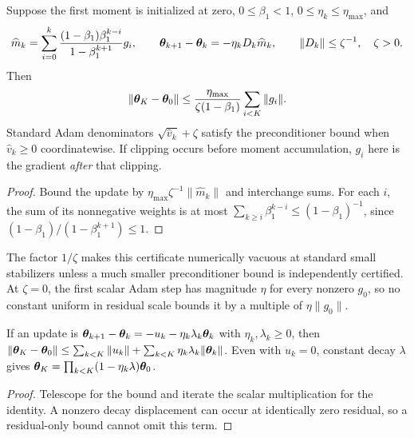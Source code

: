 \begin{lemma}
\label{lem:astra_adam}
Suppose the first moment is initialized at zero, $0\le\beta_1<1$,
$0\le\eta_k\le\eta_{\max}$, and
\[
 \widehat m_k=\sum_{i=0}^k
 \frac{(1-\beta_1)\beta_1^{k-i}}{1-\beta_1^{k+1}}g_i,
 \qquad {\boldsymbol{\theta}}_{k+1}-{\boldsymbol{\theta}}_k=-\eta_kD_k\widehat m_k,
 \qquad \|D_k\|\le\zeta^{-1},\quad\zeta>0.
\]
Then
\begin{equation}\label{eq:astra_adam}
 \|{\boldsymbol{\theta}}_K-{\boldsymbol{\theta}}_0\|
 \le\frac{\eta_{\max}}{\zeta(1-\beta_1)}\sum_{i<K}\|g_i\|.
\end{equation}
Standard Adam denominators $\sqrt{\widehat v_k}+\zeta$ satisfy the
preconditioner bound when $\widehat v_k\ge0$ coordinatewise. If
clipping occurs before moment accumulation, $g_i$ here is the gradient
\emph{after} that clipping.
\end{lemma}
\begin{proof}
Bound the update by $\eta_{\max}\zeta^{-1}\|\widehat m_k\|$ and
interchange sums. For each $i$, the sum of its nonnegative weights is
at most $\sum_{k\ge i}\beta_1^{k-i}\le(1-\beta_1)^{-1}$, since
$(1-\beta_1)/(1-\beta_1^{k+1})\le1$.
\end{proof}
\begin{remark}
The factor $1/\zeta$ makes this certificate numerically vacuous at
standard small stabilizers unless a much smaller preconditioner bound
is independently certified. At $\zeta=0$, the first scalar Adam step
has magnitude $\eta$ for every nonzero $g_0$, so no constant uniform
in residual scale bounds it by a multiple of $\eta\|g_0\|$.
\end{remark}

\begin{lemma}
\label{lem:astra_decay}
If an update is ${\boldsymbol{\theta}}_{k+1}-{\boldsymbol{\theta}}_k=-u_k-\eta_k\lambda_k{\boldsymbol{\theta}}_k$
with $\eta_k,\lambda_k\ge0$, then
$\|{\boldsymbol{\theta}}_K-{\boldsymbol{\theta}}_0\|\le\sum_{k<K}\|u_k\|+
\sum_{k<K}\eta_k\lambda_k\|{\boldsymbol{\theta}}_k\|$.
Even with $u_k=0$, constant decay $\lambda$ gives
${\boldsymbol{\theta}}_K=\prod_{k<K}(1-\eta_k\lambda){\boldsymbol{\theta}}_0$.
\end{lemma}
\begin{proof}
Telescope for the bound and iterate the scalar multiplication for the
identity. A nonzero decay displacement can occur at identically zero
residual, so a residual-only bound cannot omit this term.
\end{proof}

